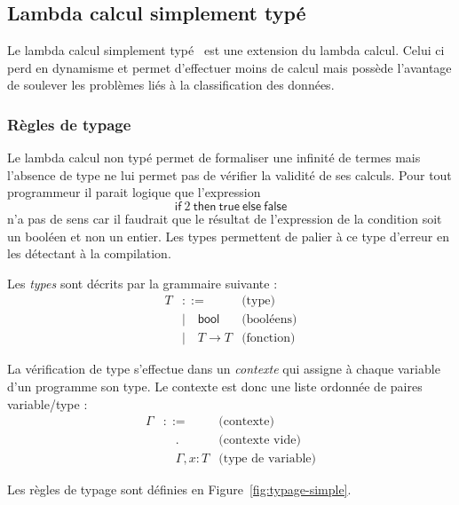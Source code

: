 \documentclass{article}
\theoremstyle{definition}
\theoremstyle{remark}
\begin{document}
\subsection{Lambda calcul simplement typé}


Le lambda calcul simplement typé~\citep{church:simple-type} est une
extension du lambda calcul. Celui ci perd en dynamisme et permet
d'effectuer moins de calcul mais possède l'avantage de soulever les
problèmes liés à la classification des données.


\subsubsection{Règles de typage}

Le lambda calcul non typé permet de formaliser une infinité de termes
mais l'absence de type ne lui permet pas de vérifier la validité de ses
calculs.
Pour tout programmeur il parait logique que l'expression
%
\[
 \mathsf{if}\: 2\: \mathsf{then}\: \mathsf{true}\: \mathsf{else}\: \mathsf{false}
\]
%
n'a pas de sens car il faudrait que le résultat de l'expression de la
condition soit un booléen et non un entier. Les types permettent de
palier à ce type d'erreur en les détectant à la compilation.


Les \emph{types} sont décrits par la grammaire suivante :
%
\begin{align*}
  T &::=             & \mbox{(type)} \\
    &|\quad \mathsf{bool} & \mbox{(booléens)} \\
    &|\quad T \rightarrow T   &  \mbox{(fonction)} 
\end{align*}

La vérification de type s'effectue dans un \emph{contexte} qui assigne
à chaque variable d'un programme son type. Le contexte est donc une
liste ordonnée de paires variable/type :
%
\begin{align*}
  \Gamma &::= &\mbox{(contexte)} \\
         &\quad . & \mbox{(contexte vide)} \\
         &\quad \Gamma, x : T & \mbox{(type de variable)} 
\end{align*}

Les règles de typage sont définies en Figure~\ref{fig:typage-simple}.
\end{document}
